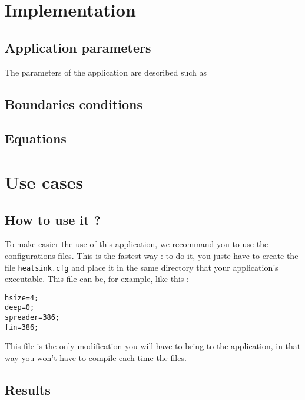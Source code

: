 \section{Implementation}
\label{heat:impl}

\subsection{Application parameters}
\label{heat:param}

The parameters of the application are described such as 


\subsection{Boundaries conditions}
\label{heat:bc_impl}

\subsection{Equations}
\label{heat:eq_impl}

\section{Use cases}
\subsection{How to use it ?}
To make easier the use of this application, we recommand you to use the configurations files. This is the fastest way : to do it, you juste have to create the file \lstinline!heatsink.cfg! and place it in the same directory that your application's executable. This file can be, for example, like this :
\begin{lstlisting}
hsize=4;
deep=0;
spreader=386;
fin=386;
\end{lstlisting}
This file is the only modification you will have to bring to the application, in that way you won't have to compile each time the files.

\subsection{Results}
